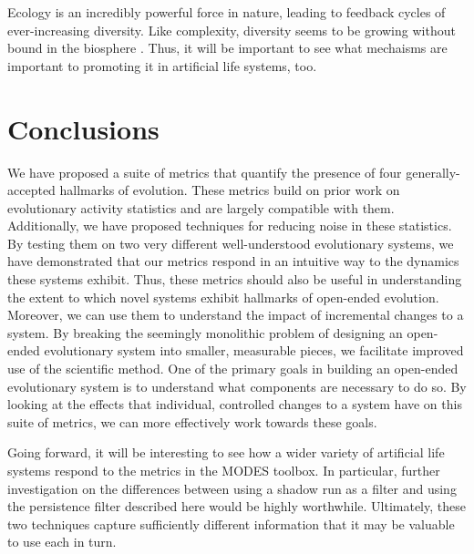 \documentclass[letterpaper]{article}
\begin{document}


Ecology is an incredibly powerful force in nature, leading to feedback cycles of ever-increasing diversity. Like complexity, diversity seems to be growing without bound in the biosphere \citep{harmon_species_2015}. Thus, it will be important to see what mechaisms are important to promoting it in artificial life systems, too.

\section{Conclusions}
We have proposed a suite of metrics that quantify the presence of four generally-accepted hallmarks of evolution. These metrics build on prior work on evolutionary activity statistics and are largely compatible with them. Additionally, we have proposed techniques for reducing noise in these statistics.  By testing them on two very different well-understood evolutionary systems, we have demonstrated that our metrics respond in an intuitive way to the dynamics these systems exhibit. Thus, these metrics should also be useful in understanding the extent to which novel systems exhibit hallmarks of open-ended evolution. Moreover, we can use them to understand the impact of incremental changes to a system. By breaking the seemingly monolithic problem of designing an open-ended evolutionary system into smaller, measurable pieces, we facilitate improved use of the scientific method. One of the primary goals in building an open-ended evolutionary system is to understand what components are necessary to do so. By looking at the effects that individual, controlled changes to a system have on this suite of metrics, we can more effectively work towards these goals.

Going forward, it will be interesting to see how a wider variety of artificial life systems respond to the metrics in the MODES toolbox. In particular, further investigation on the differences between using a shadow run as a filter and using the persistence filter described here would be highly worthwhile. Ultimately, these two techniques capture sufficiently different information that it may be valuable to use each in turn.
\end{document}
